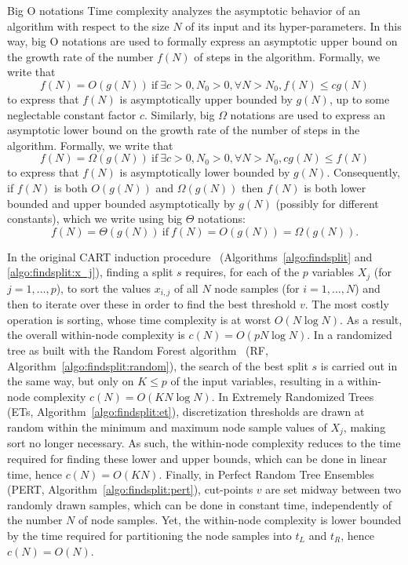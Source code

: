 \begin{remark}{Big O notations}
Time complexity analyzes the asymptotic behavior of an algorithm
with respect to the size $N$ of its input and its hyper-parameters. In this way,
big O notations are used to formally express an asymptotic upper bound on the
growth rate of the number $f(N)$ of steps in the algorithm. Formally,
we write that
\begin{equation}
f(N) =  O(g(N)) \ \text{if}\ \exists c > 0, N_0 > 0, \forall N > N_0, f(N) \leq c g(N)
\end{equation}
to express that  $f(N)$ is asymptotically upper bounded by $g(N)$, up to some neglectable constant factor $c$.
Similarly, big $\Omega$ notations are used to express an asymptotic lower
bound on the growth rate of the number of steps in the algorithm. Formally,
we write that
\begin{equation}
f(N) =  \Omega(g(N)) \ \text{if}\ \exists c > 0, N_0 > 0, \forall N > N_0,  c g(N) \leq f(N)
\end{equation}
to express that $f(N)$ is asymptotically lower bounded by $g(N)$.
Consequently, if $f(N)$ is both $O(g(N))$ and $\Omega(g(N))$ then $f(N)$ is
both lower bounded and upper bounded asymptotically by $g(N)$ (possibly for different constants),
which we write using big $\Theta$ notations:
\begin{equation}
f(N) = \Theta(g(N)) \ \text{if}\  f(N) =  O(g(N)) = \Omega(g(N)).
\end{equation}
\end{remark}

In the original CART induction procedure~\citep{breiman:1984}
(Algorithms~\ref{algo:findsplit} and \ref{algo:findsplit:x_j}), finding a split
$s$  requires, for each of the $p$ variables $X_j$ (for $j=1,\dots,p$), to sort
the values $x_{i,j}$ of all $N$ node samples (for $i=1,\dots,N$) and then to
iterate over these in order to find the best threshold $v$. The most costly
operation is sorting, whose time complexity is at worst $O(N \log N)$. As a
result, the overall within-node complexity is $c(N) = O(p N \log N)$. In a
randomized tree as built with the Random Forest algorithm~\citep{breiman:2001}
(RF, Algorithm~\ref{algo:findsplit:random}), the search of the best split $s$
is carried out in the same way, but only on $K \leq p$ of the input variables,
resulting in a within-node complexity $c(N) = O(K N \log N)$. In Extremely
Randomized Trees~\citep{geurts:2006} (ETs, Algorithm~\ref{algo:findsplit:et}),
discretization thresholds are drawn at random within the minimum and maximum
node sample values of $X_j$, making sort no longer necessary. As such, the
within-node complexity reduces to the time required for finding these lower and
upper bounds, which can be done in linear time, hence $c(N)=O(KN)$. Finally, in
Perfect Random Tree Ensembles~\citep{cutler:2001} (PERT,
Algorithm~\ref{algo:findsplit:pert}), cut-points $v$ are set midway between
two randomly drawn samples, which can be done in constant time, independently
of the number $N$ of node samples. Yet, the within-node complexity is lower
bounded by the time required for partitioning the node samples into ${t_L}$ and
${t_R}$, hence $c(N)=O(N)$.

